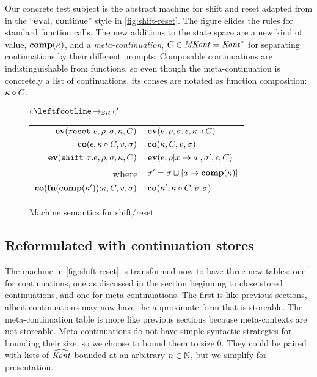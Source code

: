 Our concrete test subject is the abstract machine for shift and reset adapted from \citet{ianjohnson:Biernacki2006274} in the ``{\bf ev}al, {\bf co}ntinue'' style in \autoref{fig:shift-reset}.
%
The figure elides the rules for standard function calls.
%
The new additions to the state space are a new kind of value, $\mathbf{comp}(\kappa)$, and a \emph{meta-continuation}, $C \in \mathit{MKont} = \mathit{Kont}^*$ for separating continuations by their different prompts.
%
Composable continuations are indistinguishable from functions, so even though the meta-continuation is concretely a list of continuations, its conses are notated as function composition: $\kappa\circ C$.

\begin{figure}
  \centering
  $\mstate \stepto_\SR \mstate'$ \\
  \begin{tabular}{r|l}%
    \hline
    $\mathbf{ev}(\texttt{reset}\ e, \rho, \sigma,\kappa, C)$
    &
    $\mathbf{ev}(e, \rho, \sigma,\epsilon, \kappa\circ C)$
    \\
    $\mathbf{co}(\epsilon, \kappa\circ C, v,\sigma)$
    &
    $\mathbf{co}(\kappa, C, v,\sigma)$
    \\
    $\mathbf{ev}(\texttt{shift}\ x. e, \rho, \sigma,\kappa, C)$
    &
    $\mathbf{ev}(e, \rho[x \mapsto a],\sigma',\epsilon,C)$
    \\
    where & $\sigma' = \sigma\sqcup[a \mapsto \mathbf{comp}(\kappa)]$
    \\
    $\mathbf{co}(\mathbf{fn}{}(\mathbf{comp}(\kappa')){\tt :} \kappa, C, v,\sigma)$
    &
    $\mathbf{co}(\kappa', \kappa\circ C, v,\sigma)$
  \end{tabular}  
  \caption{Machine semantics for shift/reset}
  \label{fig:shift-reset}
\end{figure}

\subsection{Reformulated with continuation stores}
%
The machine in \autoref{fig:shift-reset} is transformed now to have three new tables: one for continuations, one as discussed in the section beginning to close stored continuations, and one for meta-continuations.
%
The first is like previous sections, albeit continuations may now have the approximate form that is storeable.
%
The meta-continuation table is more like previous sections because meta-contexts are not storeable.
%
Meta-continuations do not have simple syntactic strategies for bounding their size, so we choose to bound them to size 0.
%
They could be paired with lists of $\widehat{\mathit{Kont}}$ bounded at an arbitrary $n \in {\mathbb N}$, but we simplify for presentation.

